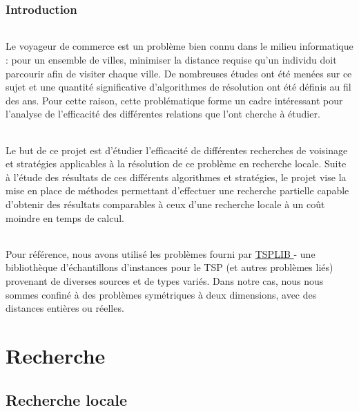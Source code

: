 \documentclass[a4paper,10pt]{report}
\begin{document}
\pagebreak
\section*{Introduction}

\paragraph{} %
  Le voyageur de commerce est un problème bien connu dans le milieu informatique
: pour un ensemble de villes, minimiser la distance requise qu'un individu doit
parcourir afin de visiter chaque ville. De nombreuses études ont été menées sur
ce sujet et une quantité significative d'algorithmes de résolution ont été
définis au fil des ans. Pour cette raison, cette problématique forme un cadre
intéressant pour l'analyse de l'efficacité des différentes relations que l'ont
cherche à étudier.

\paragraph{} %
  Le but de ce projet est d'étudier l'efficacité de différentes recherches de
voisinage et stratégies applicables à la résolution de ce problème en recherche
locale. Suite à l'étude des résultats de ces différents algorithmes et
stratégies, le projet vise la mise en place de méthodes permettant d'effectuer
une recherche partielle capable d'obtenir des résultats comparables à ceux d'une
recherche locale à un coût moindre en temps de calcul.


\paragraph{} %
  Pour référence, nous avons utilisé les problèmes fourni par
\href{https://www.iwr.uni-heidelberg.de/groups/comopt/software/TSPLIB95/}{TSPLIB
}
- une bibliothèque d'échantillons d'instances pour le TSP (et autres problèmes
liés) provenant de diverses sources et de types variés. Dans notre cas, nous
nous sommes confiné à des problèmes symétriques à deux dimensions, avec des
distances entières ou réelles.


\part{Recherche}
\chapter{Recherche locale}
\end{document}
